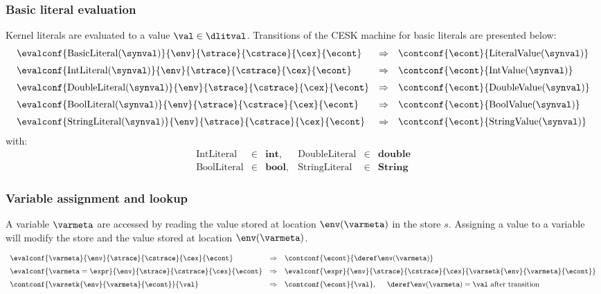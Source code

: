 \documentclass{article}
\begin{document}
\subsubsection{Basic literal evaluation}
\label{subsubsec:basic-literal-eval}
Kernel literals are evaluated to a value $\val \in \dlitval$. Transitions of the CESK machine for basic literals are presented below:
\[
  \begin{array}{lcll}
	\evalconf{\mathrm{BasicLiteral(\synval)}}{\env}{\strace}{\cstrace}{\cex}{\econt}
	& \Rightarrow &
	\contconf{\econt}{\mathrm{LiteralValue(\synval)}}\\[2mm]

	\evalconf{\mathrm{IntLiteral(\synval)}}{\env}{\strace}{\cstrace}{\cex}{\econt}
	& \Rightarrow &
	\contconf{\econt}{\mathrm{IntValue(\synval)}}\\[2mm]

	\evalconf{\mathrm{DoubleLiteral(\synval)}}{\env}{\strace}{\cstrace}{\cex}{\econt}
	& \Rightarrow &
	\contconf{\econt}{\mathrm{DoubleValue(\synval)}}\\[2mm]

	\evalconf{\mathrm{BoolLiteral(\synval)}}{\env}{\strace}{\cstrace}{\cex}{\econt}
	& \Rightarrow &
	\contconf{\econt}{\mathrm{BoolValue(\synval)}}\\[2mm]

	\evalconf{\mathrm{StringLiteral(\synval)}}{\env}{\strace}{\cstrace}{\cex}{\econt}
	& \Rightarrow &
	\contconf{\econt}{\mathrm{StringValue(\synval)}}

  \end{array}
\]
with:
\[
  \begin{array}{lcllcl}
	\textrm{IntLiteral} &\in &\mathbf{int},  &\textrm{DoubleLiteral} &\in &\mathbf{double}\\
	\textrm{BoolLiteral} &\in &\mathbf{bool}, &\textrm{StringLiteral} &\in &\mathbf{String}
  \end{array}
\]

\subsubsection{Variable assignment and lookup}
\label{subsubsec:variable-assignment-and-lookup}
A variable $\varmeta$ are accessed by reading the value stored at location $\env(\varmeta)$ in the store $s$. Assigning a value to a variable will modify the store and the value stored at location  $\env(\varmeta)$.

\[
  \begin{array}{lcl}
	\evalconf{\varmeta}{\env}{\strace}{\cstrace}{\cex}{\econt}
	& \Rightarrow &
	\contconf{\econt}{\deref\env(\varmeta)}\\[2mm]

	\evalconf{\varmeta = \expr}{\env}{\strace}{\cstrace}{\cex}{\econt}
	& \Rightarrow &
	\evalconf{\expr}{\env}{\strace}{\cstrace}{\cex}{\varsetk{\env}{\varmeta}{\econt}}\\[2mm]

	\contconf{\varsetk{\env}{\varmeta}{\econt}}{\val}
	& \Rightarrow &
	\contconf{\econt}{\val}, \hspace{5mm} \deref\env(\varmeta) = \val \textrm{ after transition}

  \end{array}
\]
\end{document}
